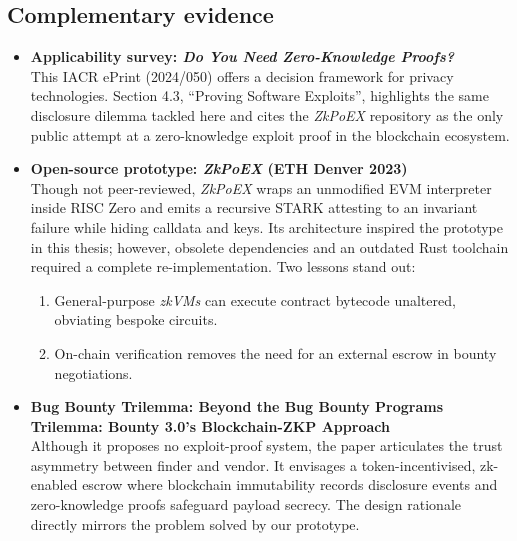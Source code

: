 \subsection*{Complementary evidence}

\begin{itemize}
    \item \textbf{Applicability survey: \textit{Do You Need Zero-Knowledge Proofs?} \cite{ernstberger2024you}}\label{sec:needzk}\\
          This IACR ePrint (2024/050) offers a decision framework for privacy technologies.  
          Section 4.3, “Proving Software Exploits”, highlights the same disclosure dilemma tackled here and cites the \textit{ZkPoEX}\cite{zkpoex-old} repository as the only public attempt at a zero-knowledge exploit proof in the blockchain ecosystem.

    \item \textbf{Open-source prototype: \textit{ZkPoEX} (ETH Denver 2023) \cite{zkpoex-old}}\label{sec:zkpoex-old}\\
          Though not peer-reviewed, \textit{ZkPoEX} wraps an unmodified EVM interpreter inside RISC Zero and emits a recursive STARK attesting to an invariant failure while hiding calldata and keys.  
          Its architecture inspired the prototype in this thesis; however, obsolete dependencies and an outdated Rust toolchain required a complete re-implementation.  
          Two lessons stand out: 
          \begin{enumerate}[label=\texttt{(\roman*)}]
              \item General-purpose \textit{zkVMs} can execute contract bytecode unaltered, obviating bespoke circuits.
              \item On-chain verification removes the need for an external escrow in bounty negotiations.
          \end{enumerate}
    \item \textbf{Bug Bounty Trilemma: Beyond the Bug Bounty Programs Trilemma: Bounty 3.0’s Blockchain-ZKP Approach \cite{BugBountyPaper}}\\
          Although it proposes no exploit-proof system, the paper articulates the trust asymmetry between finder and vendor.  
          It envisages a token-incentivised, zk-enabled escrow where blockchain immutability records disclosure events and zero-knowledge proofs safeguard payload secrecy.  
          The design rationale directly mirrors the problem solved by our prototype.
\end{itemize}

